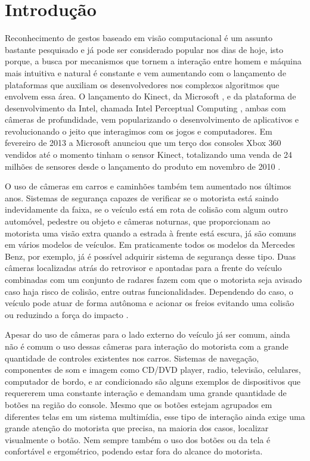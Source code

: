 \chapter{Introdução}

Reconhecimento de gestos baseado em visão computacional é um assunto bastante pesquisado e já pode ser considerado popular nos dias de hoje, isto porque, a busca por mecanismos que tornem a interação entre homem e máquina mais intuitiva e natural é constante e vem aumentando com o lançamento de plataformas que auxiliam os desenvolvedores nos complexos algoritmos que envolvem essa área.
O lançamento do Kinect, da Microsoft \cite{kinect}, e da plataforma de desenvolvimento da Intel, chamada Intel Perceptual Computing \cite{intel},  ambas com câmeras de profundidade, vem popularizando o desenvolvimento de aplicativos e revolucionando o jeito que interagimos com os jogos e computadores. Em fevereiro de 2013 a Microsoft anunciou que um terço dos consoles Xbox 360 vendidos até o momento tinham o sensor Kinect, totalizando  uma venda de 24 milhões de sensores desde o lançamento do produto em novembro de 2010 \cite{kinect_sales}.

O uso de câmeras em carros e caminhões também tem aumentado nos últimos anos. Sistemas de segurança capazes de verificar se o motorista está saindo indevidamente da faixa, se o veículo está em rota de colisão com algum outro automóvel, pedestre ou objeto e câmeras noturnas, que proporcionam ao motorista uma visão extra quando a  estrada à frente está escura, já são comuns em vários modelos de veículos. Em praticamente todos os modelos da Mercedes Benz, por exemplo, já é possível adquirir sistema de segurança desse tipo. Duas câmeras localizadas atrás do retrovisor e apontadas para a frente do veículo combinadas com um conjunto de radares fazem com que o motorista seja avisado caso haja risco de colisão, entre outras funcionalidades. Dependendo do caso, o veículo pode atuar de forma autônoma e acionar os freios evitando uma colisão ou reduzindo a força do impacto \cite{mercedes_youtube, mercedes_safety}. 

Apesar do uso de câmeras para o lado externo do veículo já ser comum, ainda não é comum o uso dessas câmeras para interação do motorista com a grande quantidade de controles existentes nos carros. Sistemas de navegação, componentes de som e imagem como CD/DVD player, radio, televisão, celulares, computador de bordo, e ar condicionado são alguns exemplos de dispositivos que requererem uma constante interação e demandam uma grande quantidade de botões na região do console. Mesmo que os botões estejam agrupados em diferentes telas em um sistema multimídia, esse tipo de interação ainda exige uma grande atenção do motorista que precisa, na maioria dos casos, localizar visualmente o botão. Nem sempre também o uso dos botões ou da tela é confortável e ergométrico, podendo estar fora do alcance do motorista.

